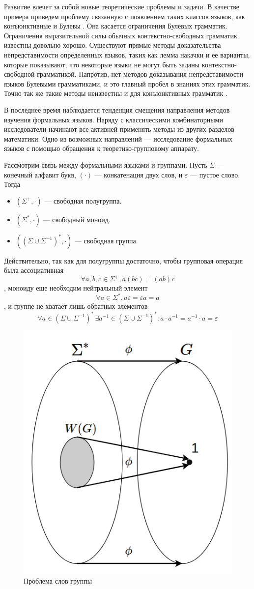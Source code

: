 \documentclass[14pt]{matmex-diploma-custom}
\begin{document}
Развитие влечет за собой новые теоретические проблемы и задачи. 
В качестве примера приведем проблему связанную с появлением таких классов языков, как конъюнктивные \cite{ConjGrammars} и Булевы \cite{BoolGrammars}.
Она касается
ограничения Булевых грамматик. Ограничения выразительной силы обычных контекстно-свободных грамматик
известны довольно хорошо. Существуют прямые методы доказательства непредставимости
определенных языков, таких как лемма накачки и ее
варианты, которые показывают, что некоторые языки не могут быть заданы
 контекстно-свободной грамматикой. Напротив, нет методов доказывания
непредставимости языков Булевыми грамматиками, и это главный пробел в
знаниях этих грамматик. Точно так же такие методы неизвестны
и для конъюнктивных грамматик \cite{OKHOTIN201327}.

В последнее время наблюдается тенденция смещения направления методов изучения формальных языков. Наряду с классическими комбинаторными исследователи начинают все активней применять методы из других разделов математики.
Одно из возможных направлений --- исследование формальных языков с помощью обращения 
к теоретико-групповому аппарату.

Рассмотрим связь между формальными языками и группами. 
Пусть $\Sigma$ --- конечный алфавит букв, $(\cdot)$ --- конкатенация двух слов, 
и $\varepsilon$ --- пустое слово.
Тогда 
\begin{itemize}
    \item $(\Sigma^+, \cdot)$ --- свободная полугруппа.
    \item $(\Sigma^*, \cdot)$ --- свободный моноид.
    \item $((\Sigma \cup \Sigma^{-1})^*, \cdot)$ --- свободная группа.
\end{itemize}
 
 Действительно, так как для 
полугруппы достаточно, чтобы групповая операция была ассоциативная
$$\forall a, b, c \in \Sigma^+, a(bc)=(ab)c$$
, моноиду еще необходим нейтральный элемент 
$$\forall a \in \Sigma^*, a\varepsilon=\varepsilon a = a$$
, и группе не хватает лишь обратных элементов
$$\forall a \in (\Sigma \cup \Sigma^{-1})^* \, 
\exists a^{-1} \in (\Sigma \cup \Sigma^{-1})^* : a \cdot a^{-1} = a^{-1} \cdot a = \varepsilon$$

\begin{figure}[H]
\centering
  \includegraphics[width=0.5\linewidth]{pics/3.png}
  \caption{Проблема слов группы}
  \label{fig:word_problem}
\end{figure}
\end{document}
